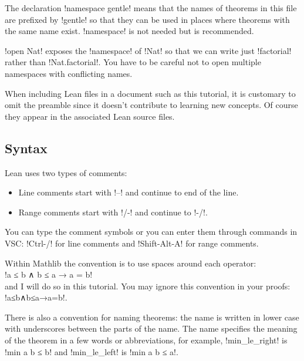 The declaration !namespace gentle! means that the names of theorems in this file are prefixed by !gentle! so that they can be used in places where theorems with the same name exist. !namespace! is not needed but is recommended.

!open Nat! exposes the !namespace! of !Nat! so that we can write just !factorial! rather than !Nat.factorial!. You have to be careful not to open multiple namespaces with conflicting names.

When including Lean files in a document such as this tutorial, it is customary to omit the preamble since it doesn't contribute to learning new concepts. Of course they appear in the associated Lean source files.

\subsection*{Syntax}

Lean uses two types of comments: 
\begin{itemize}
\item Line comments start with !--! and continue to end of the line.
\item Range comments start with !/-! and continue to !-/!.
\end{itemize}
You can type the comment symbols or you can enter them through commands in VSC: !Ctrl-/! for line comments and !Shift-Alt-A! for range comments.

Within Mathlib the convention is to use spaces around each operator:\\
\indnt{}!a ≤ b ∧ b ≤ a → a = b!\\
and I will do so in this tutorial. You may ignore this convention in your proofs: !a≤b∧b≤a→a=b!.

There is also a convention for naming theorems: the name is written in lower case with underscores between the parts of the name. The name specifies the meaning of the theorem in a few words or abbreviations, for example, !min_le_right! is !min a b ≤ b! and !min_le_left! is !min a b ≤ a!.


